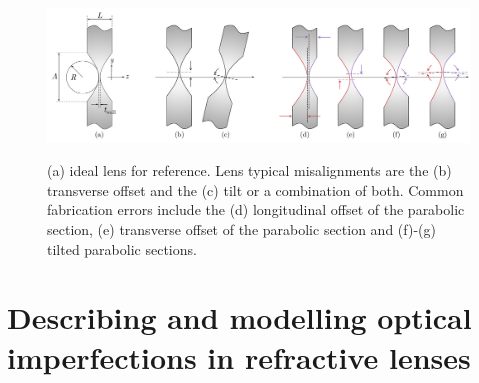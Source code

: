 \begin{refsection}
\begin{figure}[t]
    \centering
    {\includegraphics[width=1.\linewidth]{figures/ch04/lens_cuts.pdf}}
    \caption[Modelling misalignments and fabrication errors in CRLs]{(a) ideal lens for reference. Lens typical misalignments are the (b) transverse offset and the (c) tilt or a combination of both. Common fabrication errors include the (d) longitudinal offset of the parabolic section, (e) transverse offset of the parabolic section and (f)-(g) tilted parabolic sections.}
    \label{fig:lens_cuts}
\end{figure}

\section{Describing and modelling optical imperfections in refractive lenses}\label{sec:describing_modelling}


\end{refsection}
